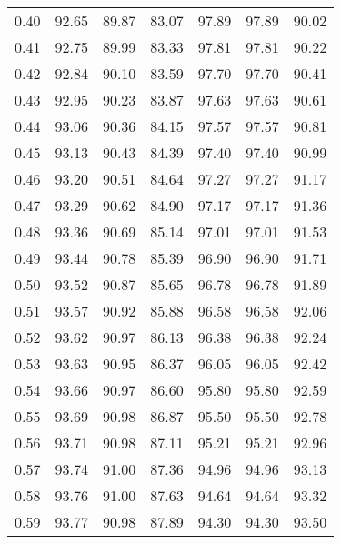 \begin{tabular}{|c|c|c|c|c|c|c|}
      0.40 &     92.65 &     89.87 &      83.07 &   97.89 &      97.89 &         90.02 \\
      0.41 &     92.75 &     89.99 &      83.33 &   97.81 &      97.81 &         90.22 \\
      0.42 &     92.84 &     90.10 &      83.59 &   97.70 &      97.70 &         90.41 \\
      0.43 &     92.95 &     90.23 &      83.87 &   97.63 &      97.63 &         90.61 \\
      0.44 &     93.06 &     90.36 &      84.15 &   97.57 &      97.57 &         90.81 \\
      0.45 &     93.13 &     90.43 &      84.39 &   97.40 &      97.40 &         90.99 \\
      0.46 &     93.20 &     90.51 &      84.64 &   97.27 &      97.27 &         91.17 \\
      0.47 &     93.29 &     90.62 &      84.90 &   97.17 &      97.17 &         91.36 \\
      0.48 &     93.36 &     90.69 &      85.14 &   97.01 &      97.01 &         91.53 \\
      0.49 &     93.44 &     90.78 &      85.39 &   96.90 &      96.90 &         91.71 \\
      0.50 &     93.52 &     90.87 &      85.65 &   96.78 &      96.78 &         91.89 \\
      0.51 &     93.57 &     90.92 &      85.88 &   96.58 &      96.58 &         92.06 \\
      0.52 &     93.62 &     90.97 &      86.13 &   96.38 &      96.38 &         92.24 \\
      0.53 &     93.63 &     90.95 &      86.37 &   96.05 &      96.05 &         92.42 \\
      0.54 &     93.66 &     90.97 &      86.60 &   95.80 &      95.80 &         92.59 \\
      0.55 &     93.69 &     90.98 &      86.87 &   95.50 &      95.50 &         92.78 \\
      0.56 &     93.71 &     90.98 &      87.11 &   95.21 &      95.21 &         92.96 \\
      0.57 &     93.74 &     91.00 &      87.36 &   94.96 &      94.96 &         93.13 \\
      0.58 &     93.76 &     91.00 &      87.63 &   94.64 &      94.64 &         93.32 \\
      0.59 &     93.77 &     90.98 &      87.89 &   94.30 &      94.30 &         93.50 \\

\end{tabular}
